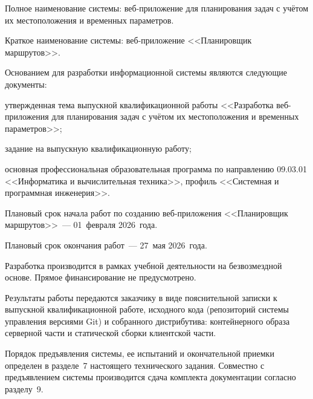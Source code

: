 Полное наименование системы: веб-приложение для планирования задач с учётом их местоположения и временных параметров.

Краткое наименование системы: веб-приложение <<Планировщик маршрутов>>.

Основанием для разработки информационной системы являются следующие документы:
\begin{compactlist}
  \item утвержденная тема выпускной квалификационной работы <<Разработка веб-приложения для планирования задач с учётом их местоположения и временных параметров>>;
  \item задание на выпускную квалификационную работу;
  \item основная профессиональная образовательная программа по направлению 09.03.01 <<Информатика и вычислительная техника>>, профиль <<Системная и программная инженерия>>.
\end{compactlist}

Плановый срок начала работ по созданию веб-приложения <<Планировщик маршрутов>>~--- 01~февраля 2026~года.

Плановый срок окончания работ~--- 27~мая 2026~года.

Разработка производится в рамках учебной деятельности на безвозмездной основе.
Прямое финансирование не предусмотрено.

Результаты работы передаются заказчику в виде пояснительной записки к выпускной
квалификационной работе, исходного кода (репозиторий системы управления версиями
Git) и собранного дистрибутива: контейнерного образа серверной части и статической
сборки клиентской части.

Порядок предъявления системы, ее испытаний и окончательной приемки определен в
разделе~7 настоящего технического задания. Совместно с предъявлением системы
производится сдача комплекта документации согласно разделу~9.

